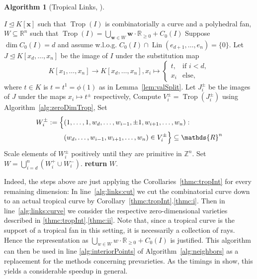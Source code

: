 \documentclass[
  paper=a4,
  titlepage,
  bibliography=totoc,
  pagesize=pdftex
]{scrartcl}
\numberwithin{figure}{section}
\numberwithin{equation}{section}
\numberwithin{table}{section}
\newcommand*\setZ{\mathds{Z}}
\newcommand*\setR{\mathds{R}}
\let\vec\mathbf
\let\idealof\trianglelefteq
\DeclareMathOperator{\Trop}{Trop}
\DeclareMathOperator{\Lin}{Lin}
\theoremstyle{definition}
\newtheorem{algo}[definition]{Algorithm}
\numberwithin{definition}{section}
\begin{document}
\begin{algo}[Tropical Links, {\cite[Algorithm~4.5]{tropPointsLinks}}]\
  \label{alg:tropLinks}
  \begin{algorithmic}[1]
    \Require $I \idealof K[\vec x]$ such that $\Trop(I)$ is combinatorially a curve and a
    polyhedral fan,
    \Ensure $W \subseteq \setR^n$ such that $\Trop(I) = \bigcup_{\vec w \in W} \vec w
      \cdot \setR_{\geq0} + C_0(I)$
    \State Suppose $\dim C_0(I) = d$ and assume w.l.o.g. $C_0(I) \cap \Lin(e_{d+1}, \dots,
      e_n) = \{0\}$.
    \State Let $J \idealof K[x_d, \dots, x_n]$ be the image of $I$ under the substitution
      map
      \[
        K[x_1, \dots, x_n] \to K[x_d, \dots, x_n], x_i \mapsto
        \begin{cases}
          t, & \text{if } i < d, \\
          x_i & \text{else},
        \end{cases}
      \]
      where $t \in K$ is $t = t^1 = \phi(1)$ as in Lemma~\ref{lem:valSplit}.
      \label{alg:links:cut}
      \State Let $J_i^\pm$ be the images of $J$ under the maps $x_i \mapsto t^\pm$
        respectively,
        \label{alg:links:curve}
      \State Compute $V_i^\pm = \Trop(J_i^\pm)$ using Algorithm~\ref{alg:zeroDimTrop},
      \State Set
        \begin{align*}
          W_i^\pm := \Bigl\{
            &(1, \dots, 1, w_d, \dots, w_{i-1}, \pm1, w_{i+1}, \dots, w_n) : \\
            &(w_d, \dots, w_{i-1}, w_{i+1}, \dots, w_n) \in V_i^\pm
          \Bigr\} \subseteq \setR^n
        \end{align*}
      \State Scale elements of $W_i^\pm$ positively until they are primitive in $\setZ^n$.
    \EndFor
    \State Set $W = \bigcup_{i=d}^n (W_i^+ \cup W_i^-)$.
    \State\textbf{return} $W$.
  \end{algorithmic}
\end{algo}

Indeed, the steps above are just applying the Corollaries~\ref{thmc:tropInt} for every
remaining dimension: In line~\ref{alg:links:cut} we cut the combinatorial curve down to an
actual tropical curve by Corollary~\ref{thmc:tropInt}.\ref{thmc:i}. Then in
line~\ref{alg:links:curve} we consider the respective zero-dimensional varieties described
in \ref{thmc:tropInt}.\ref{thmc:ii}. Note that, since a tropical curve is the support
of a tropical fan in this setting, it is necessarily a collection of rays. Hence the
representation as $\bigcup_{w \in W} w\cdot \setR_{\geq0} + C_0(I)$ is justified. This
algorithm can then be used in line \ref{alg:interiorPoints} of
Algorithm~\ref{alg:neighbors} as a replacement for the methods concerning prevarieties. As
the timings in \cite{tropPointsLinks} show, this yields a considerable speedup in general.
\end{document}

